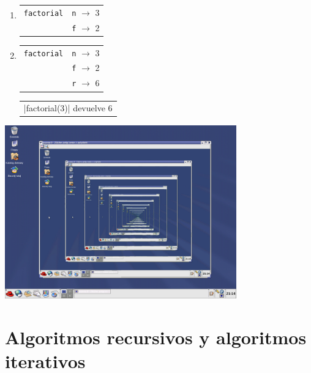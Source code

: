 \begin{enumerate}
\item {}
	\begin{tabular}{r|l|}
	\hline
	\currentframe \verb|factorial| & \verb|n| $\rightarrow$ 3 \\
	                               & \verb|f| $\rightarrow$ 2 \\
	\hline
	\end{tabular}

\item {}
	\begin{tabular}{r|l|}
	\hline
	\currentframe \verb|factorial| & \verb|n| $\rightarrow$ 3 \\
	                               & \verb|f| $\rightarrow$ 2 \\
	                               & \verb|r| $\rightarrow$ 6 \\
	\hline
	\end{tabular}
	\begin{tabular}{l}
    |factorial(3)| devuelve 6
	\end{tabular}

\end{enumerate}

\begin{minipage}{\linewidth}
\centering%
\includegraphics[width=10cm]{graficos/recursive}
%
\label{fig:redhat_recursivo}%
\end{minipage}

\section{Algoritmos recursivos y algoritmos iterativos}

